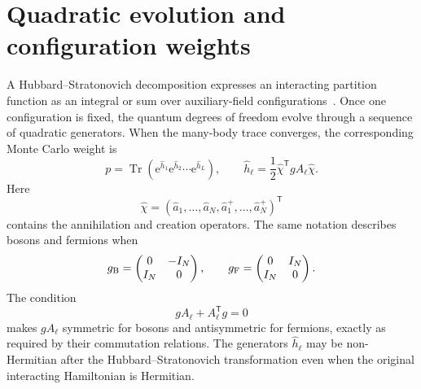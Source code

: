 \documentclass[onecolumn,aps,prb,amsmath,amssymb,superscriptaddress,longbibliography]{revtex4-2}
\newcommand{\Tr}{\operatorname{Tr}}
\newcommand{\ee}{\mathrm{e}}
\newcommand{\trans}{\mathsf{T}}
\begin{document}
\maketitle

\tableofcontents

\section{Quadratic evolution and configuration weights}

A Hubbard--Stratonovich decomposition expresses an interacting partition function as an integral or sum over auxiliary-field configurations~\cite{blankenbecler1981prd}.  Once one configuration is fixed, the quantum degrees of freedom evolve through a sequence of quadratic generators.  When the many-body trace converges, the corresponding Monte Carlo weight is
\begin{equation}
    p=\Tr\!\left(\ee^{\hat h_1}\ee^{\hat h_2}\cdots\ee^{\hat h_L}\right),
    \qquad
    \hat h_\ell=\frac12\hat\chi^\trans gA_\ell\hat\chi .
    \label{eq:configuration_weight}
\end{equation}
Here
\begin{equation}
    \hat\chi=
    (\hat a_1,\ldots,\hat a_N,
     \hat a_1^+,\ldots,\hat a_N^+)^\trans
    \label{eq:nambu_spinor}
\end{equation}
contains the annihilation and creation operators.  The same notation describes bosons and fermions when
\begin{equation}
    g_{\rm B}=\begin{pmatrix}0&-I_N\\ I_N&0\end{pmatrix},
    \qquad
    g_{\rm F}=\begin{pmatrix}0&I_N\\ I_N&0\end{pmatrix}.
    \label{eq:g_matrices}
\end{equation}
The condition
\begin{equation}
    gA_\ell+A_\ell^\trans g=0
    \label{eq:quadratic_algebra}
\end{equation}
makes \(gA_\ell\) symmetric for bosons and antisymmetric for fermions, exactly as required by their commutation relations.  The generators \(\hat h_\ell\) may be non-Hermitian after the Hubbard--Stratonovich transformation even when the original interacting Hamiltonian is Hermitian.
\end{document}
